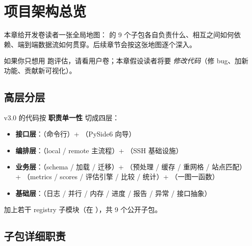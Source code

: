 
\chapter{项目架构总览}

本章给开发卷读者一张全局地图：\openbench{} 的 9 个子包各自负责什么、相互之间如何依赖、端到端数据流如何贯穿。后续章节会按这张地图逐个深入。

如果你只想用 \openbench{} 跑评估，请看用户卷；本章假设读者将要 \emph{修改代码}（修 bug、加新功能、贡献新可视化）。

\section{高层分层}

\openbench{} v3.0 的代码按 \textbf{职责单一性} 切成四层：

\begin{itemize}
  \item \textbf{接口层}：（命令行）+ （PySide6 向导）
  \item \textbf{编排层}：（local / remote 主流程）+ （SSH 基础设施）
  \item \textbf{业务层}：（schema / 加载 / 迁移）+ （预处理 / 缓存 / 重网格 / 站点匹配）+ （metrics / scores / 评估引擎 / 比较 / 统计）+ （一图一函数）
  \item \textbf{基础层}：（日志 / 并行 / 内存 / 进度 / 报告 / 异常 / 接口抽象）
\end{itemize}

加上若干 registry 子模块（在 ），共 9 个公开子包。

\section{子包详细职责}


